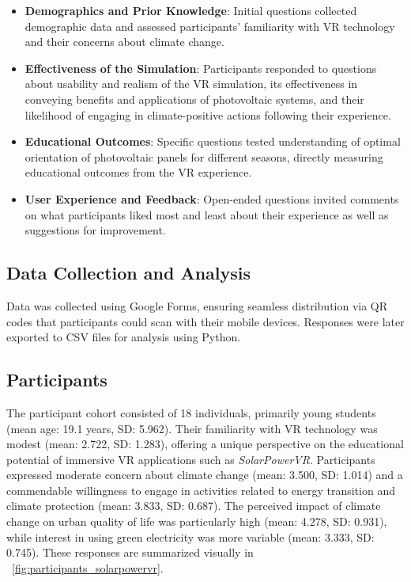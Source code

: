 \documentclass[draft, final]{vutinfth} %
\begin{document}
\begin{itemize}
    \item \textbf{Demographics and Prior Knowledge}: Initial questions collected demographic data and assessed participants' familiarity with VR technology and their concerns about climate change.
    \item \textbf{Effectiveness of the Simulation}: Participants responded to questions about usability and realism of the VR simulation, its effectiveness in conveying benefits and applications of photovoltaic systems, and their likelihood of engaging in climate-positive actions following their experience.
    \item \textbf{Educational Outcomes}: Specific questions tested understanding of optimal orientation of photovoltaic panels for different seasons, directly measuring educational outcomes from the VR experience.
    \item \textbf{User Experience and Feedback}: Open-ended questions invited comments on what participants liked most and least about their experience as well as suggestions for improvement.
\end{itemize}

\subsection{Data Collection and Analysis}

Data was collected using Google Forms, ensuring seamless distribution via QR codes that participants could scan with their mobile devices. Responses were later exported to CSV files for analysis using Python.

\subsection{Participants}
The participant cohort consisted of 18 individuals, primarily young students (mean age: 19.1 years, SD: 5.962). Their familiarity with VR technology was modest (mean: 2.722, SD: 1.283), offering a unique perspective on the educational potential of immersive VR applications such as \textit{SolarPowerVR}. Participants expressed moderate concern about climate change (mean: 3.500, SD: 1.014) and a commendable willingness to engage in activities related to energy transition and climate protection (mean: 3.833, SD: 0.687). The perceived impact of climate change on urban quality of life was particularly high (mean: 4.278, SD: 0.931), while interest in using green electricity was more variable (mean: 3.333, SD: 0.745). These responses are summarized visually in \figurename~\ref{fig:participants_solarpowervr}.
\end{document}
